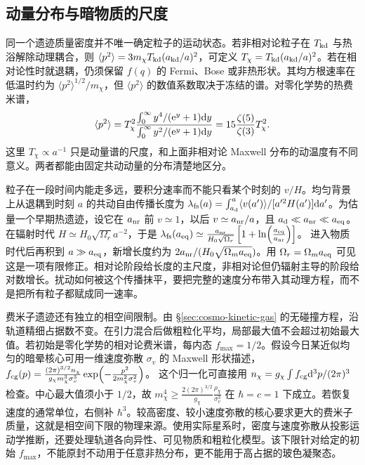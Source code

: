 \subsection{动量分布与暗物质的尺度}

同一个遗迹质量密度并不唯一确定粒子的运动状态。若非相对论粒子在 $T_{\rm kd}$ 与热浴解除动理耦合，则 $\langle p^2\rangle=3m_\chi T_{\rm kd}(a_{\rm kd}/a)^2$，可定义 $T_\chi=T_{\rm kd}(a_{\rm kd}/a)^2$。若在相对论性时就退耦，仍须保留 $f(q)$ 的 Fermi、Bose 或非热形状。其均方根速率在低温时约为 $\langle p^2\rangle^{1/2}/m_\chi$，但 $\langle p^2\rangle$ 的数值系数取决于冻结的谱。对零化学势的热费米谱，
\[
 \langle p^2\rangle=
 T_\chi^2\frac{\int_0^\infty y^4/(\mathrm{e}^y+1)\dd y}
                  {\int_0^\infty y^2/(\mathrm{e}^y+1)\dd y}
 =15\frac{\zeta(5)}{\zeta(3)}T_\chi^2 .
\]
这里 $T_\chi\propto a^{-1}$ 只是动量谱的尺度，和上面非相对论 Maxwell 分布的动温度有不同意义。两者都能由固定共动动量的分布清楚地区分。

粒子在一段时间内能走多远，要积分速率而不能只看某个时刻的 $v/H$。均匀背景上从退耦到时刻 $a$ 的共动自由传播长度为 $\lambda_{\rm fs}(a)=\int_{a_{\rm d}}^a\langle v(a')\rangle/[a'^2H(a')]\dd a'$。为估量一个早期热遗迹，设它在 $a_{\rm nr}$ 前 $v\simeq1$，以后 $v\simeq a_{\rm nr}/a$，且 $a_{\rm d}\ll a_{\rm nr}\ll a_{\rm eq}$。在辐射时代 $H\simeq H_0\sqrt{\Omega_r}a^{-2}$，于是 $\lambda_{\rm fs}(a_{\rm eq})\simeq\allowbreak{} \frac{a_{\rm nr}}{H_0\sqrt{\Omega_r}} \left[1+\ln\!\left(\frac{a_{\rm eq}}{a_{\rm nr}}\right)\right]$。
进入物质时代后再积到 $a\gg a_{\rm eq}$，新增长度约为 $2a_{\rm nr}/(H_0\sqrt{\Omega_m a_{\rm eq}})$。用 $\Omega_r=\Omega_ma_{\rm eq}$ 可见这是一项有限修正。相对论阶段给长度的主尺度，非相对论但仍辐射主导的阶段给对数增长。扰动如何被这个传播抹平，要把完整的速度分布带入其动理方程，而不是把所有粒子都赋成同一速率。

费米子遗迹还有独立的相空间限制。由 \S\ref{sec:cosmo-kinetic-gas} 的无碰撞方程，沿轨道精细占据数不变。在引力混合后做粗粒化平均，局部最大值不会超过初始最大值。若初始是零化学势的相对论费米谱，每内态 $f_{\max}=1/2$。假设今日某近似均匀的暗晕核心可用一维速度弥散 $\sigma_v$ 的 Maxwell 形状描述， $f_{\rm cg}(p)=\allowbreak{} \frac{(2\pi)^{3/2}n_\chi}{g_\chi m_\chi^3\sigma_v^3} \exp\!\left(-\frac{p^2}{2m_\chi^2\sigma_v^2}\right)$。
这个归一化可直接用 $n_\chi=g_\chi\int f_{\rm cg}\dd^3p/(2\pi)^3$ 检查。中心最大值须小于 $1/2$，故 $m_\chi^4\geq \frac{2(2\pi)^{3/2}}{g_\chi}\frac{\rho_\chi}{\sigma_v^3}$
在 $\hbar=c=1$ 下成立。若恢复速度的通常单位，右侧补 $\hbar^3$。较高密度、较小速度弥散的核心要求更大的费米子质量，这就是相空间下限的物理来源。使用实际星系时，密度与速度弥散从投影运动学推断，还要处理轨道各向异性、可见物质和粗粒化模型。该下限针对给定的初始 $f_{\max}$，不能原封不动用于任意非热分布，更不能用于高占据的玻色凝聚态。


